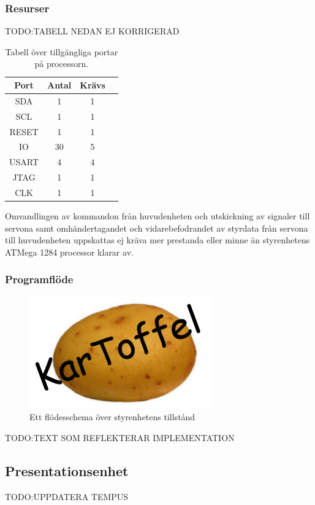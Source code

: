 \documentclass{article}
\begin{document}
\subsubsection{Resurser}
TODO:TABELL NEDAN EJ KORRIGERAD
\begin{table}[H]
  \centering
  \begin{tabular}{ | c | c | c | c |}
    \hline
    \textbf{Port} & \textbf{Antal} & \textbf{Krävs} \\
    \hline
    SDA & 1 & 1 \\
    \hline
    SCL & 1 & 1 \\
    \hline
    RESET & 1 & 1 \\
    \hline
    IO & 30 & 5 \\
    \hline
    USART & 4 & 4 \\
    \hline
    JTAG & 1 & 1 \\
    \hline
    CLK & 1 & 1 \\
    \hline
  \end{tabular}
  \caption{Tabell över tillgängliga portar på processorn.}
\end{table}

Omvandlingen av kommandon från huvudenheten och utskickning av signaler till servona samt omhändertagandet och vidarebefodrandet av styrdata från servona till huvudenheten uppskattas ej kräva mer prestanda eller minne än styrenhetens ATMega 1284 processor klarar av.

\subsubsection{Programflöde}

\begin{figure}[H]
\centering
\includegraphics[scale=0.6]{Logo}
\caption{Ett flödesschema över styrenhetens tillstånd}
\label{fig:styrenhet_flowchart}
\end{figure}

TODO:TEXT SOM REFLEKTERAR IMPLEMENTATION

\subsection{Presentationsenhet}
TODO:UPPDATERA TEMPUS
\end{document}
